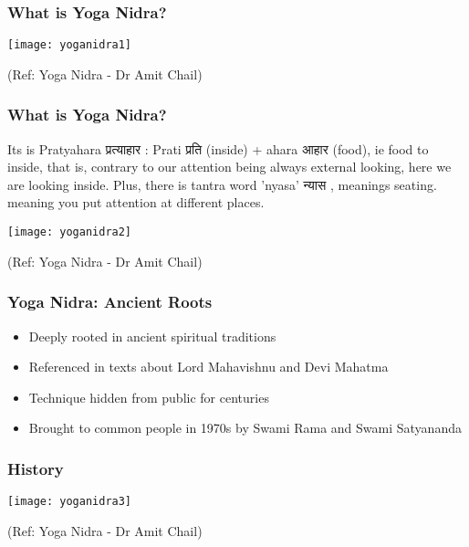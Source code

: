 \begin{frame}[fragile]\frametitle{What is Yoga Nidra?}
      \begin{center}
        \texttt{[image: yoganidra1]}

		{\tiny (Ref: Yoga Nidra - Dr Amit Chail)}		
        \end{center}

\end{frame}

\begin{frame}[fragile]\frametitle{What is Yoga Nidra?}
Its is Pratyahara प्रत्याहार  : Prati प्रति (inside) + ahara आहार  (food), ie food to inside, that is, contrary to our attention being always external looking, here we are looking inside. Plus, there is tantra word 'nyasa' न्यास , meanings seating. meaning you put attention at different places.

      \begin{center}
        \texttt{[image: yoganidra2]}

		{\tiny (Ref: Yoga Nidra - Dr Amit Chail)}		
        \end{center}

\end{frame}

\begin{frame}[fragile]\frametitle{Yoga Nidra: Ancient Roots}
    \begin{itemize}
        \item Deeply rooted in ancient spiritual traditions
        \item Referenced in texts about Lord Mahavishnu and Devi Mahatma
        \item Technique hidden from public for centuries
        \item Brought to common people in 1970s by Swami Rama and Swami Satyananda
    \end{itemize}
\end{frame}

\begin{frame}[fragile]\frametitle{History}
      \begin{center}
        \texttt{[image: yoganidra3]}

		{\tiny (Ref: Yoga Nidra - Dr Amit Chail)}		
        \end{center}

\end{frame}

